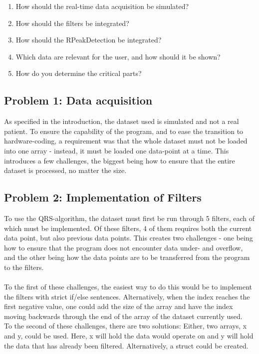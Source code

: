\documentclass[12pt,a4paper]{article}
\begin{document}
 	\begin{enumerate}
	\item How should the real-time data acquisition be simulated?
	\item How should the filters be integrated?
	\item How should the RPeakDetection be integrated?
	\item Which data are relevant for the user, and how should it be shown?
	\item How do you determine the critical parts?
\end{enumerate}

\subsection{Problem 1: Data acquisition}
	As specified in the introduction, the dataset used is simulated and not a real patient. To ensure the capability of the program, and to ease the transition to hardware-coding, a requirement was that the whole dataset must not be loaded into one array - instead, it must be loaded one data-point at a time. This introduces a few challenges, the biggest being how to ensure that the entire dataset is processed, no matter the size.\\

\subsection{Problem 2: Implementation of Filters}
	To use the QRS-algorithm, the dataset must first be run through 5 filters, each of which must be implemented. Of these filters, 4 of them requires both the current data point, but also previous data points. This creates two challenges - one being how to ensure that the program does not encounter data under- and overflow, and the other being how the data points are to be transferred from the program to the filters.\\
\\	
	To the first of these challenges, the easiest way to do this would be to implement the filters with strict if/else sentences. Alternatively, when the index reaches the first negative value, one could add the size of the array and have the index moving backwards through the end of the array of the dataset currently used.\\
	To the second of these challenges, there are two solutions: Either, two arrays, x and y, could be used. Here, x will hold the data would operate on and y will hold the data that has already been filtered. Alternatively, a struct could be created.\\
\end{document}
